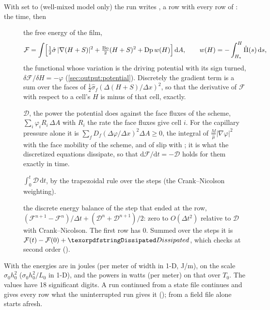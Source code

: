 With  set to  (well-mixed model only) the
run writes , a row with every row of : the
time, then
%
\begin{description}
  \item[] the free energy of the film,
    \begin{equation*}
      \mathcal F = \int\Bigl[\tfrac12\hat\sigma\,|\nabla(H+S)|^2
        + \tfrac{\mathrm{Bo}}{2}(H+S)^2 + \mathrm{Dp}\,w(H)\Bigr]\,\mathrm dA,
      \qquad w(H) = -\int_{H_*}^{H}\hat{\Pi}(s)\,\mathrm ds,
    \end{equation*}
    the functional whose variation is the driving potential with its sign
    turned, $\delta\mathcal F/\delta H = -\varphi$
    (\cref{sec:output:potential}). Discretely the gradient term is a sum
    over the faces of $\tfrac12\hat\sigma_f(\Delta(H+S)/\Delta x)^2$, so that
    the derivative of $\mathcal F$ with respect to a cell's $H$ is minus
     of that cell, exactly.
  \item[] $\mathcal D$, the power the potential does
    against the face fluxes of the scheme, $\sum_i\varphi_i R_i\,\Delta A$
    with $R_i$ the rate the face fluxes give cell $i$. For the capillary
    pressure alone it is $\sum_f D_f(\Delta\varphi/\Delta x)^2\Delta A \ge 0$,
    the integral of $\frac{M}{\hat\mu}|\nabla\varphi|^2$ with the face mobility of
    the scheme, and of slip with ; it is what the
    discretized equations dissipate, so that $\mathrm d\mathcal F/\mathrm dt =
    -\mathcal D$ holds for them exactly in time.
  \item[] $\int_0^t\mathcal D\,\mathrm dt$, by the trapezoidal rule over the
    steps (the Crank--Nicolson weighting).
  \item[] the discrete energy balance of the step that
    ended at the row, $(\mathcal F^{n+1} - \mathcal F^n)/\Delta t +
    (\mathcal D^n + \mathcal D^{n+1})/2$: zero to $O(\Delta t^2)$ relative
    to $\mathcal D$ with Crank--Nicolson. The first row has 0. Summed over
    the steps it is $\mathcal F(t) - \mathcal F(0) + \code{Dissipated}$,
    which  checks at second order ().
\end{description}
%
With   the energies are in joules (per
meter of width in 1-D, J/m), on the scale
$\sigma_0 h_0^2$ ($\sigma_0 h_0^2/L_0$ in 1-D), and the powers in watts (per
meter) on that over $T_0$. The values have 18 significant digits. A run
continued from a state file continues  and gives every row
what the uninterrupted run gives it (); from a field
file alone  starts afresh.

